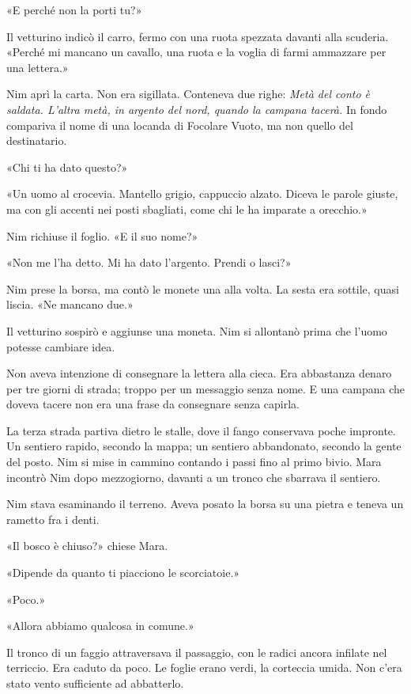 \documentclass[10pt,a4paper]{article}
\begin{document}
«E perché non la porti tu?»

Il vetturino indicò il carro, fermo con una ruota spezzata davanti alla scuderia. «Perché mi mancano un cavallo, una ruota e la voglia di farmi ammazzare per una lettera.»

Nim aprì la carta. Non era sigillata. Conteneva due righe: \emph{Metà del conto è saldata. L'altra metà, in argento del nord, quando la campana tacerà.} In fondo compariva il nome di una locanda di Focolare Vuoto, ma non quello del destinatario.

«Chi ti ha dato questo?»

«Un uomo al crocevia. Mantello grigio, cappuccio alzato. Diceva le parole giuste, ma con gli accenti nei posti sbagliati, come chi le ha imparate a orecchio.»

Nim richiuse il foglio. «E il suo nome?»

«Non me l'ha detto. Mi ha dato l'argento. Prendi o lasci?»

Nim prese la borsa, ma contò le monete una alla volta. La sesta era sottile, quasi liscia. «Ne mancano due.»

Il vetturino sospirò e aggiunse una moneta. Nim si allontanò prima che l'uomo potesse cambiare idea.

Non aveva intenzione di consegnare la lettera alla cieca. Era abbastanza denaro per tre giorni di strada; troppo per un messaggio senza nome. E una campana che doveva tacere non era una frase da consegnare senza capirla.

La terza strada partiva dietro le stalle, dove il fango conservava poche impronte. Un sentiero rapido, secondo la mappa; un sentiero abbandonato, secondo la gente del posto. Nim si mise in cammino contando i passi fino al primo bivio.
Mara incontrò Nim dopo mezzogiorno, davanti a un tronco che sbarrava il sentiero.

Nim stava esaminando il terreno. Aveva posato la borsa su una pietra e teneva un rametto fra i denti.

«Il bosco è chiuso?» chiese Mara.

«Dipende da quanto ti piacciono le scorciatoie.»

«Poco.»

«Allora abbiamo qualcosa in comune.»

Il tronco di un faggio attraversava il passaggio, con le radici ancora infilate nel terriccio. Era caduto da poco. Le foglie erano verdi, la corteccia umida. Non c'era stato vento sufficiente ad abbatterlo.
\end{document}
